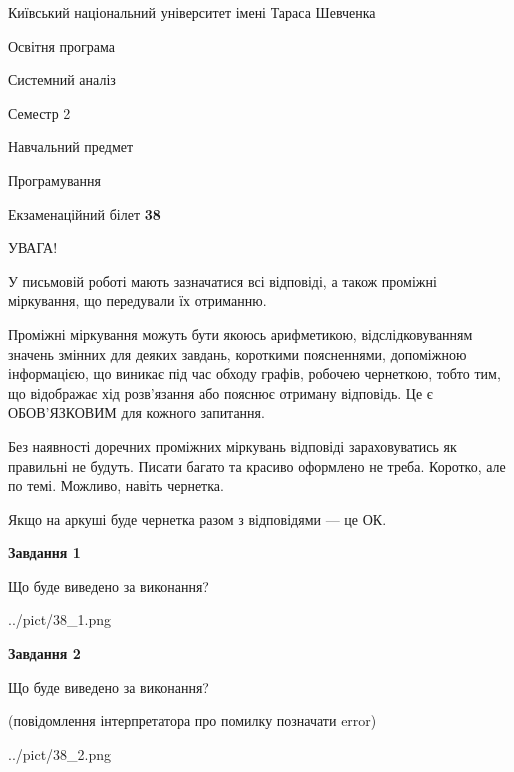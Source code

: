 \documentclass[12pt, ukrainian]{article}
\begin{document}
{{\begin {small}\par
{ \center  Київський національний університет імені Тараса Шевченка \par}
{\parbox {5 cm}{Освітня програма \hfill}{\parbox {7 cm}{Системний аналіз \hfill}}\parbox {6 cm}{\hfill Семестр 2}}\par
{\parbox {5 cm} {Навчальний предмет \hfill}\parbox {7 cm}{Програмування \hfill}\parbox {6cm}{\hfill}\par}\vspace{-7pt} \end{small}}{\center Екзаменаційний білет \No \textbf
{ 38 }\par}}
{
\begin {large}
УВАГА!

У письмовій роботі мають зазначатися всі відповіді, а також проміжні міркування, що передували їх отриманню.

Проміжні міркування можуть бути якоюсь арифметикою, відслідковуванням зна\-чень змінних для деяких завдань,
короткими поясненнями, допоміжною інформацією, що виникає під час обходу графів, робочею чернеткою,
тобто тим, що відображає хід розв’язання або пояснює отриману відповідь.
Це є ОБОВ’ЯЗКОВИМ для кожного запитання.

Без наявності доречних проміжних міркувань відповіді зараховуватись як правиль\-ні не будуть.
Писати багато та красиво оформлено не треба. Коротко, але по темі. Можли\-во, навіть чернетка.

Якщо на аркуші буде чернетка разом з відповідями --- це ОК.

\newpage

{\begin {center}\textbf{Завдання 1}\end {center}}\par
Що буде виведено за виконання?\par
\begin{center}
	{../pict/38_1.png}
\end{center}
\newpage

{\begin {center}\textbf{Завдання 2}\end {center}}\par
Що буде виведено за виконання?\par
 (повідомлення інтерпретатора про помилку позначати error)\par
\begin{center}
	{../pict/38_2.png}
\end{center}
\newpage


\end{large}}
\end{document}
